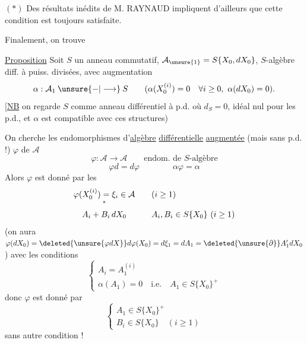 $(*)$ Des résultats inédits de M. RAYNAUD impliquent d'ailleurs que cette
condition est toujours satisfaite.

Finalement, on trouve

\uline{Proposition} Soit $S$ un anneau commutatif,
$\mathcal A_{\unsure{1}}=S\{X_0,dX_0\}$,  $S$-algèbre
diff. à puiss. divisées, avec augmentation
\[
\alpha:\mathcal A_1\mathbin{\unsure{-|\longrightarrow}}S\qquad
(\alpha(X_0^{(i)})=0\quad\forall i\geq0,\ \alpha(dX_0)=0).
\]
[\uline{NB} on regarde  $S$ comme anneau
différentiel à p.d. où $d_S=0$, idéal nul pour
les p.d., et $\alpha$ est compatible avec ces structures)

On cherche les endomorphismes \inserted{$\varphi$} d'\uline{algèbre}
\uline{différentielle} \uline{augmentée} (mais sans
p.d. !) $\varphi$ de  $\mathcal A$
\[
\varphi:\mathcal A\longrightarrow\mathcal A\qquad\text{endom. de $S$-algèbre}
\]
\[
\varphi d=d\varphi
\qquad\qquad
\alpha\varphi=\alpha
\]
Alors $\varphi$ est donné par les
\[
\begin{array}{ccl}
\varphi(X_0^{(i)})=\xi_i\in\mathcal A&&(i\geq1)\\
\text{\textquotedbl}&&\\
A_i+B_i\,dX_0&&A_i,B_i\in S\{X_0\}\ (i\geq1)
\end{array}
\]
(on aura $\varphi(dX_0)=\deleted{\unsure{\varphi dX}}d\varphi(X_0)=d\xi_1=dA_1=\deleted{\unsure{\partial}}A'_1dX_0$)
avec les conditions
\[
\begin{cases}
A_i=A_1^{(i)}\\
\alpha(A_1)=0\quad\text{i.e.}\quad A_1\in S\{X_0\}^{+}
\end{cases}
\]
donc $\varphi$ est donné par
\[
\boxed{\boxed{\begin{cases}
A_1\in S\{X_0\}^{+}\\
B_i\in S\{X_0\}\quad(i\geq1)
\end{cases}}}
\]
sans autre condition !

